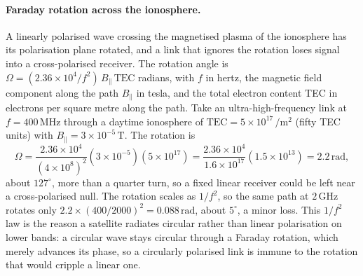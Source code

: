 \paragraph{Faraday rotation across the ionosphere.}
A linearly polarised wave crossing the magnetised plasma of the ionosphere
has its polarisation plane rotated, and a link that ignores the rotation
loses signal into a cross-polarised receiver. The rotation angle is
$\Omega = (2.36\times 10^{4}/f^2)\,B_{\parallel}\,\text{TEC}$ radians, with
$f$ in hertz, the magnetic field component along the path $B_{\parallel}$
in tesla, and the total electron content TEC in electrons per square metre
along the path. Take an ultra-high-frequency link at $f = 400\,\si{\mega
\hertz}$ through a daytime ionosphere of $\text{TEC} = 5\times 10^{17}\,
\si{\per\meter\squared}$ (fifty TEC units) with $B_{\parallel} = 3\times
10^{-5}\,\si{\tesla}$. The rotation is
\[
\Omega = \frac{2.36\times 10^{4}}{(4\times 10^{8})^{2}}(3\times 10^{-5})
(5\times 10^{17}) = \frac{2.36\times 10^{4}}{1.6\times 10^{17}}(1.5\times
10^{13}) = 2.2\,\text{rad},
\]
about $127^{\circ}$, more than a quarter turn, so a fixed linear receiver
could be left near a cross-polarised null. The rotation scales as $1/f^2$,
so the same path at $2\,\si{\giga\hertz}$ rotates only $2.2\times
(400/2000)^2 = 0.088\,\text{rad}$, about $5^{\circ}$, a minor loss. This
$1/f^2$ law is the reason a satellite radiates circular rather than linear
polarisation on lower bands: a circular wave stays circular through a
Faraday rotation, which merely advances its phase, so a circularly
polarised link is immune to the rotation that would cripple a linear one.

